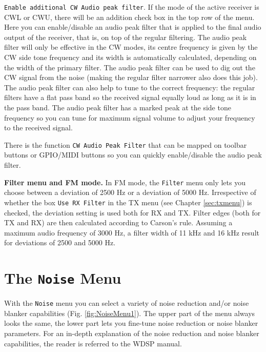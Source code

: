 \documentclass[12pt]{book}
\def\rett#1{\texttt{\color{red}#1}}
\def\bltt#1{\texttt{\color{blue}#1}}
\begin{document}
\rett{Enable additional CW Audio peak filter}. If the mode of the
active receiver is CWL or CWU, there will be an addition check box in the
top row of the menu. Here you can enable/disable an audio peak filter that
is applied to the final audio output of the receiver, that is, on top of
the regular filtering. The audio peak filter will only be effective in
the CW modes, its centre frequency is given by the CW side tone frequency
and its width is automatically calculated, depending on the
width of the primary filter. The audio peak filter can be used to dig out
the CW signal from the noise (making the regular filter narrower also
does this job). The audio peak filter can also help to tune to the correct
frequency: the regular filters have a flat pass band so the received
signal equally loud as long as it is in the pass band. The audio peak filter
has a marked peak at the side tone frequency so you can tune for maximum
signal volume to adjust your frequency to the received signal.

There is the function \bltt{CW Audio Peak Filter} that can be mapped on toolbar
buttons or GPIO/MIDI buttons so you can quickly enable/disable the audio peak
filter.

\textbf{Filter menu and FM mode.} In FM mode, the \bltt{Filter} menu only lets you
choose between a deviation of 2500 Hz or a deviation of 5000 Hz.
Irrespective of whether the box \rett{Use RX Filter} in the TX menu (see
Chapter \ref{sec:txmenu}) is checked, the deviation setting is used both for RX and TX.
Filter edges (both for
TX and RX) are then calculated according to Carson's rule. Assuming a maximum audio
frequency of 3000 Hz, a filter width of 11 kHz and 16 kHz result for deviations of 2500
and 5000 Hz.

\section{The \texttt{Noise} Menu}



With the \bltt{Noise} menu you can select a variety of noise reduction and/or
noise blanker capabilities (Fig. \ref{fig:NoiseMenu1}). The upper part of the
menu always looks the same, the lower part lets you fine-tune noise reduction
or noise blanker parameters. For an in-depth explanation of the noise reduction
and noise blanker capabilities, the reader is referred to the WDSP manual.
\end{document}
